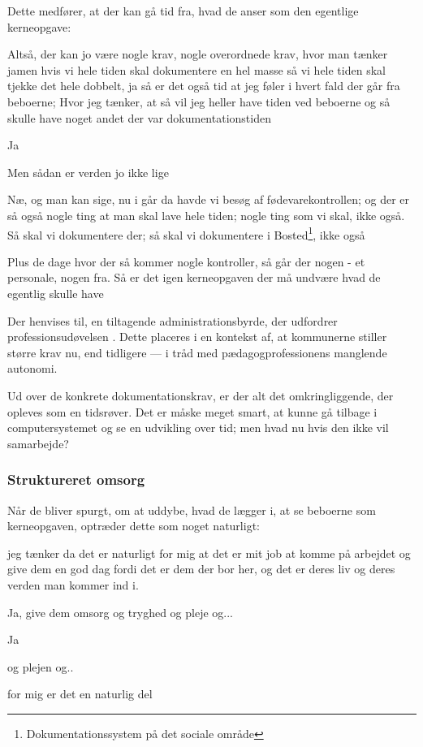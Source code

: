 Dette medfører, at der kan gå tid fra, hvad de anser som den egentlige kerneopgave:
\begin{description}

\AMB
Altså, der kan jo være nogle krav, nogle overordnede krav, hvor man tænker jamen hvis vi hele tiden skal dokumentere en hel masse så vi hele tiden skal tjekke det hele dobbelt, ja så er det også tid at jeg føler i hvert fald der går fra beboerne;
Hvor jeg tænker, at så vil jeg heller have tiden ved beboerne og så skulle have noget andet der var dokumentationstiden

\DMC
Ja

\AMB
Men sådan er verden jo ikke lige

\DMC
Næ, og man kan sige, nu i går da havde vi besøg af fødevarekontrollen; og der er så også nogle ting at man skal lave hele tiden; nogle ting som vi skal, ikke også.
Så skal vi dokumentere der; så skal vi dokumentere i Bosted\footnote{Dokumentationssystem på det sociale område}, ikke også

\AMB
Plus de dage hvor der så kommer nogle kontroller, så går der nogen - et personale, nogen fra.
Så er det igen kerneopgaven der må undvære hvad de egentlig skulle have
\end{description}

Der henvises til, en tiltagende administrationsbyrde, der udfordrer professionsudøvelsen \autocite[s. 16]{mik-meyerIndledningSkabeProfessionel2012}.
Dette placeres i en kontekst af, at kommunerne stiller større krav nu, end tidligere — i tråd med pædagogprofessionens manglende autonomi.

Ud over de konkrete dokumentationskrav, er der alt det omkringliggende, der opleves som en tidsrøver.
Det er måske meget smart, at kunne gå tilbage i computersystemet og se en udvikling over tid; men hvad nu hvis den ikke vil samarbejde?

\subsubsection{Struktureret omsorg}
Når de bliver spurgt, om at uddybe, hvad de lægger i, at se beboerne som kerneopgaven, optræder dette som noget naturligt:

\begin{description}
\AMB
jeg tænker da det er naturligt for mig at det er mit job at komme på arbejdet og give dem en god dag fordi det er dem der bor her, og det er deres liv og deres verden man kommer ind i.

\DMC
Ja, give dem omsorg og tryghed og pleje og...

\AMB
Ja

\DMC
og plejen og..

\AMB
for mig er det en naturlig del
\end{description}

